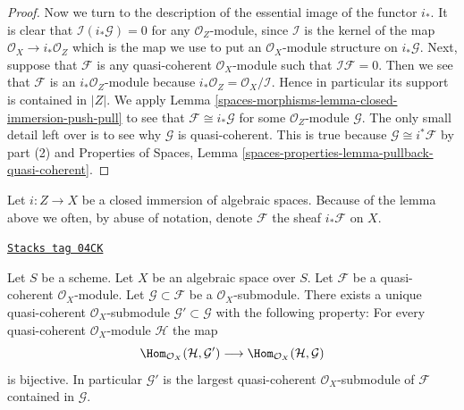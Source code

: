 \begin{proof}
\medskip\noindent
Now we turn to the description of the essential image of the
functor $i_*$. It is clear that $\mathcal{I}(i_*\mathcal{G}) = 0$
for any $\mathcal{O}_Z$-module, since $\mathcal{I}$ is the kernel
of the map $\mathcal{O}_X \to i_*\mathcal{O}_Z$ which is the map
we use to put an $\mathcal{O}_X$-module structure on $i_*\mathcal{G}$.
Next, suppose that $\mathcal{F}$ is any quasi-coherent
$\mathcal{O}_X$-module such that $\mathcal{I}\mathcal{F} = 0$.
Then we see that $\mathcal{F}$ is an $i_*\mathcal{O}_Z$-module
because $i_*\mathcal{O}_Z = \mathcal{O}_X/\mathcal{I}$. Hence in
particular its support is contained in $|Z|$. We apply
Lemma \ref{spaces-morphisms-lemma-closed-immersion-push-pull}
to see that $\mathcal{F} \cong i_*\mathcal{G}$ for some
$\mathcal{O}_Z$-module $\mathcal{G}$. The only small detail left over
is to see why $\mathcal{G}$ is quasi-coherent. This is true
because $\mathcal{G} \cong i^*\mathcal{F}$ by part (2) and
Properties of Spaces,
Lemma \ref{spaces-properties-lemma-pullback-quasi-coherent}.
\end{proof}

Let $i : Z \to X$ be a closed immersion of algebraic spaces.
Because of the lemma above we often,
by abuse of notation, denote $\mathcal{F}$ the sheaf $i_*\mathcal{F}$ on $X$.

\begin{lemma}
\label{spaces-morphisms-lemma-largest-quasi-coherent-subsheaf}
\href{https://stacks.math.columbia.edu/tag/04CK}{\texttt{Stacks tag 04CK}}

Let $S$ be a scheme. Let $X$ be an algebraic space over $S$.
Let $\mathcal{F}$ be a quasi-coherent $\mathcal{O}_X$-module.
Let $\mathcal{G} \subset \mathcal{F}$ be a $\mathcal{O}_X$-submodule.
There exists a unique quasi-coherent $\mathcal{O}_X$-submodule
$\mathcal{G}' \subset \mathcal{G}$ with the following property:
For every quasi-coherent $\mathcal{O}_X$-module $\mathcal{H}$ the map
$$
\Hom_{\mathcal{O}_X}(\mathcal{H}, \mathcal{G}')
\longrightarrow
\Hom_{\mathcal{O}_X}(\mathcal{H}, \mathcal{G})
$$
is bijective. In particular $\mathcal{G}'$ is the largest quasi-coherent
$\mathcal{O}_X$-submodule of $\mathcal{F}$ contained in $\mathcal{G}$.
\end{lemma}

